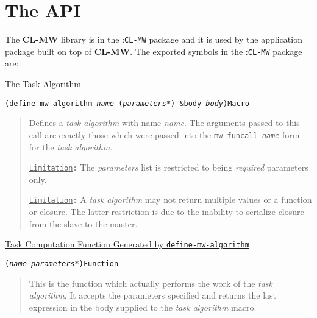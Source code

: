\documentclass[titlepage,12pt]{book}
\newcommand{\xsmall}{\latexhtml{\small}{}}
\newcommand{\xnormalsize}{\latexhtml{\normalsize}{}}
\newcommand{\clmw}{\xsmall\textbf{CL-MW}\xnormalsize\xspace}
\newcommand{\package}[1]{\mbox{:\uppercase{\xsmall\texttt{#1}\xnormalsize}} package\xspace}
\newcommand{\mwpackage}{\package{CL-MW}}
\newcommand{\ta}{\textit{task algorithm}\xspace}
\newcommand{\macro}[1]{\xsmall\mbox{\uppercase{\texttt{#1}}}\xnormalsize\xspace}
\newcommand{\genmacroname}[1]{\small\mbox{\uppercase{\texttt{#1\textit{name}}}}\normalsize\xspace}
\newcommand{\Limitation}{\texttt{\underline{Limitation}:}\xspace}
\newcommand{\apiheader}[1]{\begin{center}\underline{#1}\end{center}}
\newcommand{\apifunc}[2]{\noindent\xsmall\texttt{(#1)}\hspace*{\fill}\xnormalsize\texttt{#2}}
\newenvironment{apientry}[2]
	{\apifunc{#1}{#2}\begin{quotation}}
	{\end{quotation}}
\begin{document}
\section{The API}

The \clmw library is in the \mwpackage and it is used by the application
package built on top of \clmw. The exported symbols in the \mwpackage are:

\apiheader{The Task Algorithm}

\begin{apientry}
{define-mw-algorithm \emph{name} (\emph{parameters*}) \&body \emph{body}}
{Macro}
Defines a \ta with name \emph{name}. The arguments passed to this
call are exactly those which were passed into the \genmacroname{mw-funcall-}
form for the \ta.

\Limitation The \emph{parameters} list is restricted to being \emph{required}
parameters only. 

\Limitation A \ta may not return multiple values or a
function or closure. The latter restriction is due to the inability
to serialize closure from the slave to the master.
\end{apientry}

\apiheader{Task Computation Function Generated by \macro{define-mw-algorithm}}
\begin{apientry}
{\textit{name} \textit{parameters*}}
{Function}
This is the function which actually performs the work of the \ta. It
accepts the parameters specified and returns the last expression in
the body supplied to the \ta macro.
\end{apientry}
\end{document}

